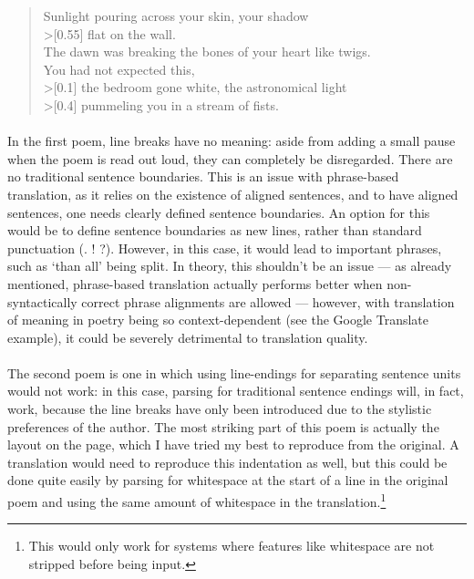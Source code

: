 \begin{minipage}{\linewidth}
  \begin{verse}
    Sunlight pouring across your skin, your shadow \\
    >[0.55\linewidth] flat on the wall. \\
    The dawn was breaking the bones of your heart like twigs. \\
    You had not expected this, \\
    >[0.1\linewidth] the bedroom gone white, the astronomical light \\
    >[0.4\linewidth] pummeling you in a stream of fists.
  \end{verse}
\end{minipage}

\paragraph{}{In the first poem, line breaks have no meaning: aside
  from adding a small pause when the poem is read out loud, they can
  completely be disregarded. There are no traditional sentence
  boundaries.  This is an issue with phrase-based translation, as it
  relies on the existence of aligned sentences, and to have aligned
  sentences, one needs clearly defined sentence boundaries. An option
  for this would be to define sentence boundaries as new lines, rather
  than standard punctuation (. !  ?). However, in this case, it would
  lead to important phrases, such as `than all' being split. In
  theory, this shouldn't be an issue --- as already mentioned,
  phrase-based translation actually performs better when
  non-syntactically correct phrase alignments are allowed --- however,
  with translation of meaning in poetry being so context-dependent
  (see the Google Translate example), it could be severely detrimental
  to translation quality. }
\paragraph{}{The second poem is one in which using line-endings for
  separating sentence units would not work: in this case, parsing for
  traditional sentence endings will, in fact, work, because the line
  breaks have only been introduced due to the stylistic preferences of
  the author. The most striking part of this poem is actually the
  layout on the page, which I have tried my best to reproduce from the
  original. A translation would need to reproduce this indentation as
  well, but this could be done quite easily by parsing for whitespace
  at the start of a line in the original poem and using the same
  amount of whitespace in the translation.\footnote{This would only
    work for systems where features like whitespace are not stripped
    before being input.}}
